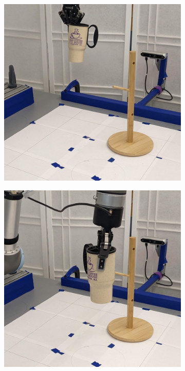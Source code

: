 \documentclass{article}
\begin{document}
\begin{figure}[]
\begin{subfigure}{(\linewidth - 0.05\linewidth)/5}
    \end{subfigure}
    \begin{subfigure}{(\linewidth - 0.05\linewidth)/5}
        \centering
        \includegraphics[width=\linewidth]{figures/episodes/mug_on_tree_zoom/7.jpg}
    \end{subfigure}
    \begin{subfigure}{(\linewidth - 0.05\linewidth)/5}
        \centering
        \includegraphics[width=\linewidth]{figures/episodes/mug_on_tree_zoom/8.jpg}

\end{subfigure}
\end{figure}
\end{document}
